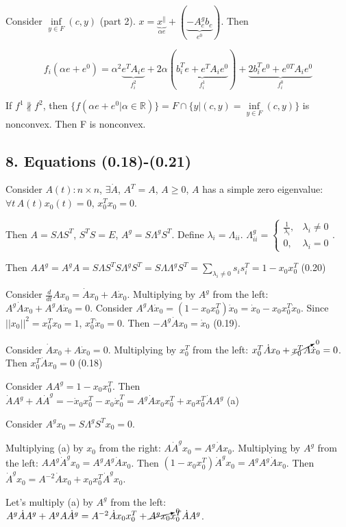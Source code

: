 \documentclass[a4paper]{article}
\begin{document}
Consider $\inf\limits_{y\in F}(c,y)$ (part 2). $x=\underbrace{x^{\parallel}}_{\alpha e}+(\underbrace{-A_c^gb_c}_{e^0})$. Then

$$f_i(\alpha e + e^0)=\alpha^2 \underbrace{e^TA_ie}_{f^2_i}+2\alpha(\underbrace{b_i^Te+e^TA_ie^0}_{f^1_i})+\underbrace{2b_i^Te^0+e^{0T}A_ie^0}_{f^0_i}$$

If $f^1\nparallel f^2$, then $\{f(\alpha e+e^0\big| \alpha\in\mathbb{R})\}=F\cap \{y\big| (c,y)=\inf\limits_{y\in F} (c,y)\}$ is nonconvex. Then F is nonconvex.
\subsection*{8. Equations (0.18)-(0.21)}
Consider $A(t)\colon n\times n$, $\exists \dot{A}$, $A^T=A$, $A\geqslant 0$, $A$ has a simple zero eigenvalue: $\forall t\,A(t)x_0(t)=0$, $x_0^Tx_0=0$.

Then $A=S\Lambda S^T$, $S^TS=E$, $A^g=S\Lambda^gS^T$. Define $\lambda_i=\Lambda_{ii}$. $\Lambda^g_{ii}=\begin{cases}
\frac{1}{\lambda_i},& \lambda_i\neq 0\\
0, &\lambda_i=0
\end{cases}$.

Then $AA^g=A^gA=S\Lambda S^TS\Lambda^gS^T=S\Lambda\Lambda^gS^T=\sum\limits_{\lambda_i\neq 0} s_is_i^T=1-x_0x_0^T$ (0.20)

Consider $\frac{d}{dt}Ax_0=\dot{A}x_0+A\dot{x}_0$. Multiplying by $A^g$ from the left: $A^g\dot{A}x_0+A^gA\dot{x}_0=0$.
Consider $A^gA\dot{x}_0=(1-x_0x_0^T)\dot{x}_0=\dot{x}_0-x_0x_0^T\dot{x}_0$. Since $||x_0||^2=x_0^Tx_0=1$, $x_0^T\dot{x}_0=0$. Then $-A^g\dot{A}x_0=\dot{x}_0$ (0.19).

Consider $\dot{A}x_0+A\dot{x}_0=0$. Multiplying by $x_0^T$ from the left: $x_0^T\dot{A}x_0+\cancelto{0}{x_0^TA}\dot{x}_0=0$. Then $x_0^T\dot{A}x_0=0$ (0.18)

Consider $AA^g=1-x_0x_0^T$. Then $\dot{A}A^g+A\dot{A}^g=-\dot{x}_0x_0^T-x_0\dot{x}_0^T=A^g\dot{A}x_0x_0^T+x_0x_0^T\dot{A}A^g$ (a)

Consider $A^gx_0=S\Lambda^gS^Tx_0=0$.

Multiplying (a) by $x_0$ from the right: $A\dot{A}^gx_0=A^g\dot{A}x_0$. Multiplying by $A^g$ from the left: $AA^g\dot{A}^gx_0=A^gA^g\dot{A}x_0$. Then $(1-x_0x_0^T)\dot{A}^gx_0=A^gA^g\dot{A}x_0$. Then $\dot{A}^gx_0=A^{-2}\dot{A}x_0+x_0x_0^T\dot{A}^gx_0$.

Let's multiply (a) by $A^g$ from the left: $A^g\dot{A}A^g+A^gA\dot{A}^g=A^{-2}\dot{A}x_0x_0^T+\cancelto{0}{A^gx_0}x_0^T\dot{A}A^g$.
\end{document}
